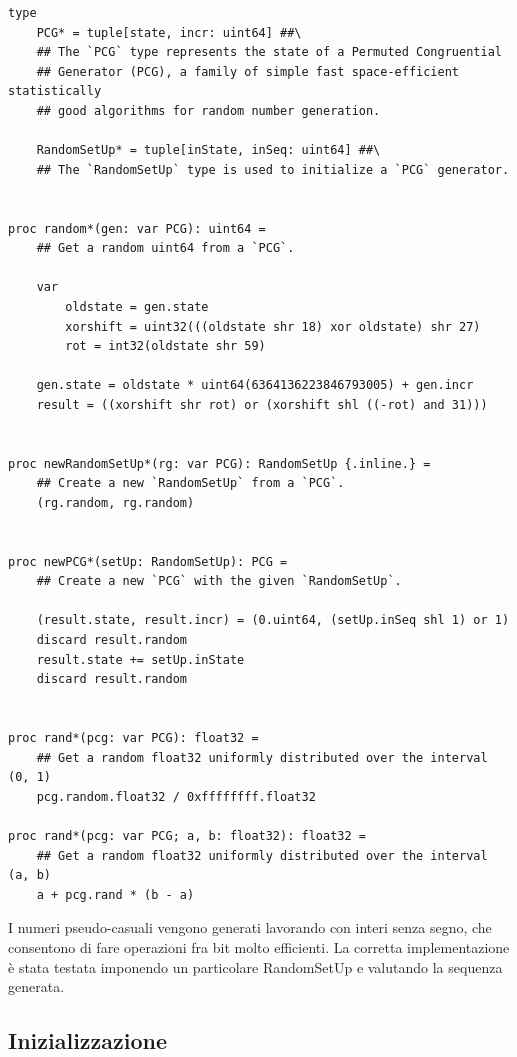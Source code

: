 \begin{verbatim}
type 
    PCG* = tuple[state, incr: uint64] ##\
    ## The `PCG` type represents the state of a Permuted Congruential 
    ## Generator (PCG), a family of simple fast space-efficient statistically 
    ## good algorithms for random number generation.

    RandomSetUp* = tuple[inState, inSeq: uint64] ##\
    ## The `RandomSetUp` type is used to initialize a `PCG` generator.


proc random*(gen: var PCG): uint64 =
    ## Get a random uint64 from a `PCG`.

    var 
        oldstate = gen.state
        xorshift = uint32(((oldstate shr 18) xor oldstate) shr 27)
        rot = int32(oldstate shr 59)

    gen.state = oldstate * uint64(6364136223846793005) + gen.incr
    result = ((xorshift shr rot) or (xorshift shl ((-rot) and 31)))


proc newRandomSetUp*(rg: var PCG): RandomSetUp {.inline.} = 
    ## Create a new `RandomSetUp` from a `PCG`.
    (rg.random, rg.random)


proc newPCG*(setUp: RandomSetUp): PCG = 
    ## Create a new `PCG` with the given `RandomSetUp`.

    (result.state, result.incr) = (0.uint64, (setUp.inSeq shl 1) or 1)
    discard result.random
    result.state += setUp.inState
    discard result.random


proc rand*(pcg: var PCG): float32 =
    ## Get a random float32 uniformly distributed over the interval (0, 1)
    pcg.random.float32 / 0xffffffff.float32

proc rand*(pcg: var PCG; a, b: float32): float32 =
    ## Get a random float32 uniformly distributed over the interval (a, b)
    a + pcg.rand * (b - a)
\end{verbatim}    

I numeri pseudo-casuali vengono generati lavorando con interi senza segno, che consentono di fare operazioni fra bit molto efficienti. 
La corretta implementazione è stata testata imponendo un particolare RandomSetUp e valutando la sequenza generata. 





\subsection{Inizializzazione}

